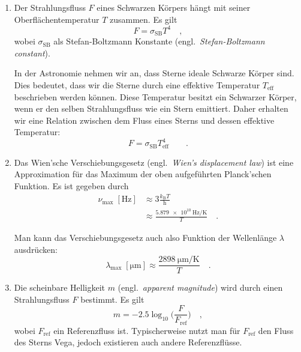 \begin{enumerate}[label=$\smalltriangleright$]
  \item
  Der Strahlungsfluss $F$ eines Schwarzen Körpers hängt mit seiner Oberflächentemperatur $T$ zusammen.
  Es gilt
  \begin{equation*}
    F = \sigma_{\mathrm{SB}} T^{4} \quad ,
  \end{equation*}
  wobei $\sigma_{\mathrm{SB}}$ als Stefan-Boltzmann Konstante (engl.\ \textit{Stefan-Boltzmann constant}).

  In der Astronomie nehmen wir an, dass Sterne ideale Schwarze Körper sind.
  Dies bedeutet, dass wir die Sterne durch eine effektive Temperatur $T_{\mathrm{eff}}$ beschrieben werden können.
  Diese Temperatur besitzt ein Schwarzer Körper, wenn er den selben Strahlungsfluss wie ein Stern emittiert.
  Daher erhalten wir eine Relation zwischen dem Fluss eines Sterns und dessen effektive Temperatur:
  \begin{equation}
    F = \sigma_{\mathrm{SB}} T_{\mathrm{eff}}^{4} \quad  \quad .
  \end{equation}


  \item
  Das Wien'sche Verschiebungsgesetz (engl.\ \textit{Wien's displacement law}) ist eine Approximation für das Maximum der oben aufgeführten Planck'schen Funktion.
  Es ist gegeben durch
  \begin{align}
    \nu_{\mathrm{max}} \; [\si{\hertz}] & \approx 3 \frac{k_{\mathrm{B}} T}{\mathrm{h}} \\
                                     & \approx \frac{\SI{5.879e10}{\hertz\per\kelvin}}{T} \quad .
  \end{align}

  Man kann das Verschiebungsgesetz auch also Funktion der Wellenlänge $\lambda$ ausdrücken:
  \begin{equation}
    \lambda_{\mathrm{max}} \; [\si{\micro\metre}] \approx \frac{\SI{2898}{\micro\metre\per\kelvin}}{T} \quad .
  \end{equation}


  \item
  Die scheinbare Helligkeit $m$ (engl.\ \textit{apparent magnitude}) wird durch einen Strahlungsfluss $F$ bestimmt.
  Es gilt
  \begin{equation}
    m = -2.5 \log_{10} \bigg( \frac{F}{F_{\mathrm{ref}}} \bigg) \quad ,
  \end{equation}
  wobei $F_{\mathrm{ref}}$ ein Referenzfluss ist.
  Typischerweise nutzt man für $F_{\mathrm{ref}}$ den Fluss des Sterns Vega, jedoch existieren auch andere Referenzflüsse.



\end{enumerate}
